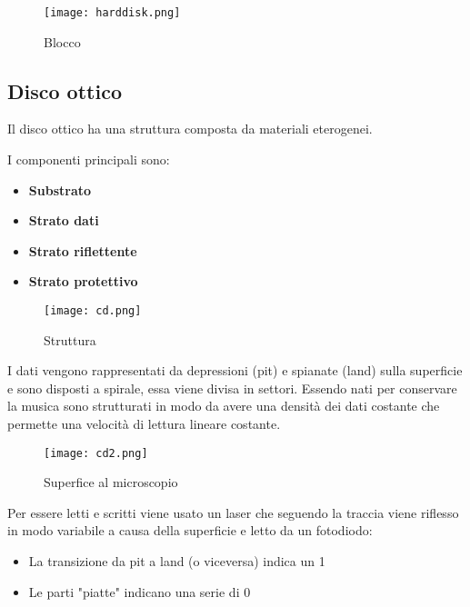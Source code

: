 \documentclass{article}
\begin{document}
\begin{figure}[ht]
    \centering
    \texttt{[image: harddisk.png]}
    \caption{Blocco}
    \label{fig:harddisk}
\end{figure}

\subsection{Disco ottico}

Il disco ottico ha una struttura composta da materiali eterogenei.

\vspace{5pt}

\noindent I componenti principali sono:
\begin{itemize}
    \item \textbf{Substrato}
    \item \textbf{Strato dati}
    \item \textbf{Strato riflettente}
    \item \textbf{Strato protettivo}\newline
\end{itemize}

\begin{figure}[ht]
    \centering
    \texttt{[image: cd.png]}
    \caption{Struttura}
    \label{fig:cd}
\end{figure}

\noindent I dati vengono rappresentati da depressioni (pit) e spianate (land) sulla superficie e sono disposti a spirale, essa viene divisa in settori. Essendo nati per conservare la musica sono strutturati in modo da avere una densità dei dati costante che permette una velocità di lettura lineare costante.

\begin{figure}[ht]
    \centering
    \texttt{[image: cd2.png]}
    \label{fig:cd2}
    \caption{Superfice al microscopio}
\end{figure}

\newpage

\noindent Per essere letti e scritti viene usato un laser che seguendo la traccia viene riflesso in modo variabile a causa della superficie e letto da un fotodiodo:
\begin{itemize}
    \item La transizione da pit a land (o viceversa) indica un 1
    \item Le parti "piatte" indicano una serie di 0
\end{itemize}
\end{document}
